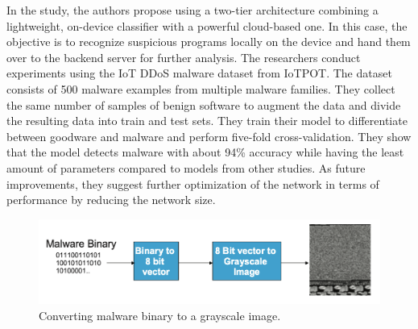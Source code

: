 \documentclass[conference, 11pt]{IEEEtran}
\begin{document}
    In the study, the authors propose using a two-tier architecture combining a lightweight, on-device classifier with a powerful cloud-based one.
    In this case, the objective is to recognize suspicious programs locally on the device and hand them over to the backend server for further analysis.
    The researchers conduct experiments using the IoT DDoS malware dataset from IoTPOT. The dataset consists of 500 malware examples from multiple malware families.
    They collect the same number of samples of benign software to augment the data and divide the resulting data into train and test sets.
    They train their model to differentiate between goodware and malware and perform five-fold cross-validation.
    They show that the model detects malware with about 94\% accuracy while having the least amount of parameters compared to models from other studies.
    As future improvements, they suggest further optimization of the network in terms of performance by reducing the network size.

    \begin{figure}[htbp]
        \centerline{\includegraphics[width=\linewidth]{figures/malware-to-gray.png}}
        \caption{Converting malware binary to a grayscale image.}
        \label{fig1}
    \end{figure}
\end{document}
